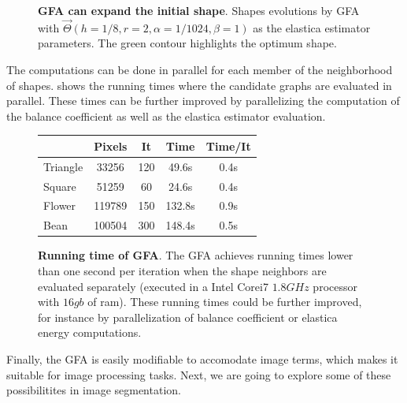 \documentclass[review]{siamart220329}
\begin{document}
\begin{figure}
\caption{\textbf{GFA can expand the initial shape}. Shapes evolutions by GFA with $\vec{\Theta}(h=1/8,r=2,\alpha=1/1024, \beta=1)$ as the elastica estimator parameters. The green contour highlights the optimum shape.}
\label{fig:graph-flow-expand}
\end{figure}
%
%
The computations can be done in parallel for each member of the neighborhood of shapes.  shows the running times where the candidate graphs are evaluated in parallel. These times can be further improved by parallelizing the computation of the balance coefficient as well as the elastica estimator evaluation.
%
%
\begin{figure}[h!]
\center
\captionsetup{type=table}
\footnotesize
	\caption{\textbf{Running time of GFA}. The GFA achieves running times lower than one second per iteration when the shape neighbors are evaluated separately (executed in a Intel Corei7 $1.8GHz$ processor with $16gb$ of ram). These running times could be further improved, for instance by parallelization of balance coefficient  or elastica energy computations.}\label{tab:summary-graph-flow-running-time} 
\begin{tabular}{|l|c|c|c|c|}
\hline
& Pixels & It & Time & Time/It\\
\hline
Triangle & 33256 & 120 & 49.6s & 0.4s \\
Square & 51259 & 60 & 24.6s & 0.4s \\
Flower & 119789 & 150 & 132.8s & 0.9s \\
Bean & 100504 & 300 & 148.4s & 0.5s \\
\hline
\end{tabular}
\end{figure}
%
%
Finally, the GFA is easily modifiable to accomodate image terms, which makes it suitable for image processing tasks. Next, we are going to explore some of these possibilitites in image segmentation.
%
%
\end{document}
